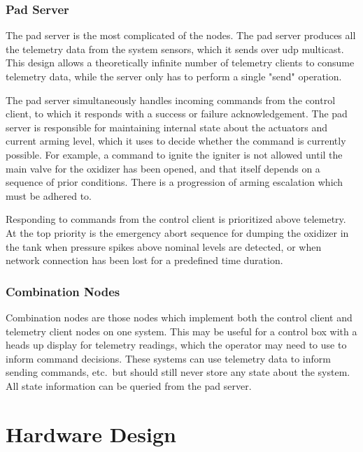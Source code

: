 \subsubsection{Pad Server}

The pad server is the most complicated of the nodes. The pad server produces all the telemetry data from the system sensors, which it sends over \gls{udp} multicast. This design allows a theoretically infinite number of telemetry clients to consume telemetry data, while the server only has to perform a single "send" operation.

The pad server simultaneously handles incoming commands from the control client, to which it responds with a success or failure acknowledgement. The pad server is responsible for maintaining internal state about the actuators and current arming level, which it uses to decide whether the command is currently possible. For example, a command to ignite the igniter is not allowed until the main valve for the oxidizer has been opened, and that itself depends on a sequence of prior conditions. There is a progression of arming escalation which must be adhered to.

Responding to commands from the control client is prioritized above telemetry. At the top priority is the emergency abort sequence for dumping the oxidizer in the tank when pressure spikes above nominal levels are detected, or when network connection has been lost for a predefined time duration.

\subsubsection{Combination Nodes}

Combination nodes are those nodes which implement both the control client and telemetry client nodes on one system. This may be useful for a control box with a heads up display for telemetry readings, which the operator may need to use to inform command decisions. These systems can use telemetry data to inform sending commands, etc.\ but should still never store any state about the system. All state information can be queried from the pad server.

\section{Hardware Design}

